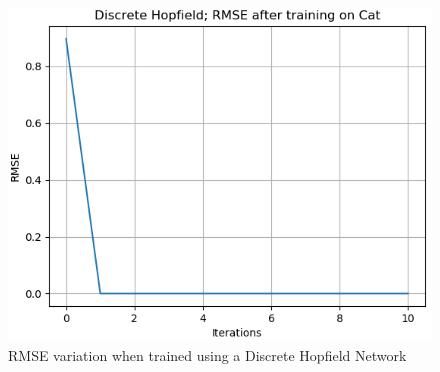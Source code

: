\documentclass[12pt,a4paper]{article}
\begin{document}
\begin{figure}[H]
\includegraphics[scale=0.45]{images/dhn_cat.png}
\caption{RMSE variation when trained using a Discrete Hopfield Network}
\end{figure}

\break
\end{document}
